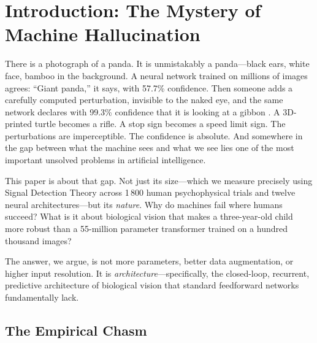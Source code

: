 \documentclass[12pt,a4paper]{article}
\begin{document}
\begin{abstract}
We close with a theoretical horizon: the \textit{Tripartite Active Inference}
framework, a coupled dynamical system of perceptual assimilation, epistemic
foraging, and neuromodulatory arousal that transitions RHAN from a passive
observer to an active cognitive agent---one that can steer its own sensory
sampling, ``squint'' to ignore adversarial noise, and halt its own computation
when prediction error reaches thermodynamic equilibrium.

\end{abstract}

\newpage
\tableofcontents
\newpage

\section{Introduction: The Mystery of Machine Hallucination}
\label{sec:intro}

There is a photograph of a panda. It is unmistakably a panda---black ears,
white face, bamboo in the background. A neural network trained on millions
of images agrees: ``Giant panda,'' it says, with 57.7\% confidence. Then
someone adds a carefully computed perturbation, invisible to the naked eye,
and the same network declares with 99.3\% confidence that it is looking at
a gibbon \citep{goodfellow2015explaining}. A 3D-printed turtle becomes a
rifle. A stop sign becomes a speed limit sign. The perturbations are
imperceptible. The confidence is absolute. And somewhere in the gap between
what the machine sees and what we see lies one of the most important unsolved
problems in artificial intelligence.

This paper is about that gap. Not just its size---which we measure precisely
using Signal Detection Theory across 1\,800 human psychophysical trials and
twelve neural architectures---but its \textit{nature}. Why do machines fail
where humans succeed? What is it about biological vision that makes a
three-year-old child more robust than a 55-million parameter transformer
trained on a hundred thousand images?

The answer, we argue, is not more parameters, better data augmentation, or
higher input resolution. It is \textit{architecture}---specifically, the
closed-loop, recurrent, predictive architecture of biological vision that
standard feedforward networks fundamentally lack.

\subsection{The Empirical Chasm}
\end{document}
